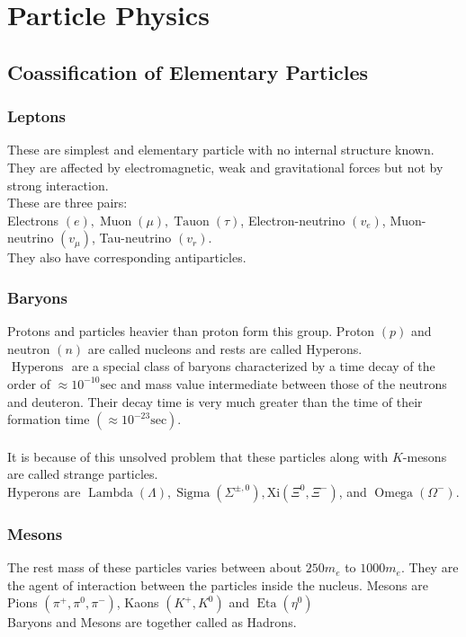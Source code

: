 \chapter{Particle Physics}
\section{Coassification of Elementary Particles}
\subsection{Leptons}
These are simplest and elementary particle with no internal structure known. They are  affected by electromagnetic, weak and gravitational forces but not by strong interaction.\\
These are three pairs:\\
Electrons $(e), \operatorname{Muon}(\mu), \operatorname{Tauon}(\tau)$, Electron-neutrino $\left(v_e\right)$, Muon-neutrino $\left(v_\mu\right)$,
Tau-neutrino $\left(v_r\right)$.\\
They also have corresponding antiparticles.
\subsection{Baryons}
Protons and particles heavier than proton form this group. Proton $(p)$ and neutron $(n)$ are called nucleons and rests are called Hyperons.\\
$\text { Hyperons }$ are a special class of baryons characterized by a time decay of the order of $\approx 10^{-10} \mathrm{sec}$ and mass value intermediate between those of the neutrons and deuteron. Their decay time is very much greater than the time of their formation time $\left(\approx 10^{-23} \mathrm{sec}\right)$.\\\\
It is because of this unsolved problem that these particles along with $K$-mesons are called strange particles.\\
Hyperons are $\operatorname{Lambda}(\Lambda), \operatorname{Sigma}\left(\Sigma^{\pm, 0}\right), \mathrm{Xi}\left(\Xi^0, \Xi^{-}\right)$, and $\operatorname{Omega}\left(\Omega^{-}\right)$.
\subsection{Mesons}
The rest mass of these particles varies between about $250 m_e$ to $1000 m_e$. They are the agent of interaction between the particles inside the nucleus. Mesons are Pions $\left(\pi^{+}, \pi^0, \pi^{-}\right)$, Kaons $\left(K^{+}, K^0\right)$ and $\operatorname{Eta}\left(\eta^0\right)$\\
Baryons and Mesons are together called as Hadrons.
